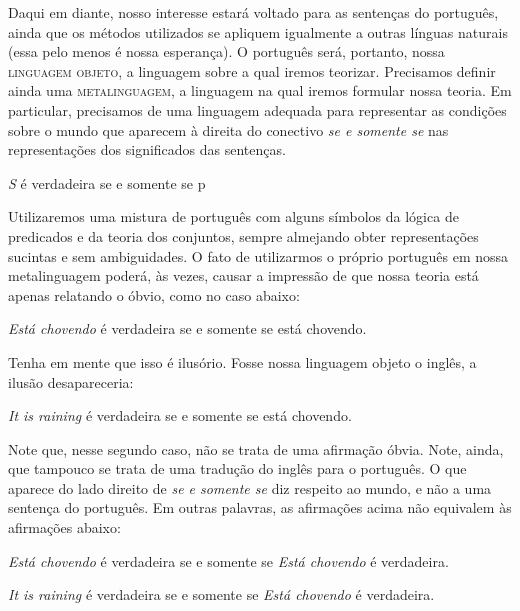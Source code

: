 Daqui em diante, nosso interesse estará voltado para as
sen\-ten\-ças do português, ainda que os métodos utilizados se
apliquem igualmente a outras línguas naturais (essa pelo menos é
nossa esperança). O português será, portanto, nossa
\textsc{linguagem objeto}, a linguagem sobre a qual
iremos teorizar. Precisamos definir ainda uma
\textsc{metalinguagem}, a linguagem na qual iremos
formular nossa teoria. Em particular, precisamos de uma linguagem
adequada para representar as condi\-çõ\-es sobre o mundo que
aparecem à direita do conectivo \textit{se e somente se}  nas
representa\-çõ\-es dos significados das sen\-ten\-ças.

\begin{exe} 
	\ex \textit{S} é verdadeira se e somente se p
\end{exe}

\n Utilizaremos uma mistura de português com alguns
símbolos da lógica de predicados e da teoria dos conjuntos, sempre
almejando obter representa\-çõ\-es sucintas e
sem ambiguidades. O fato de utilizarmos o próprio português em
nossa metalinguagem poderá, às vezes, causar a impressão de que
nossa teoria está apenas relatando o óbvio, como no caso
abaixo:

\begin{exe} 
	\ex \textit{Está chovendo} é verdadeira se e somente se está chovendo.
\end{exe}

\n Tenha em mente que isso é ilusório. Fosse nossa linguagem
objeto o inglês, a ilusão desapareceria:

\begin{exe} 
	\ex \textit{It is raining} é verdadeira se e somente se está chovendo.
\end{exe}

\noindent Note que, nesse segundo caso, não se trata de uma
afirma\-ção óbvia. Note, ainda, que tampouco se trata de uma
tradu\-ção do inglês para o português. O que aparece do lado
direito de \textit{se e somente se} diz respeito ao mundo, e não a
uma sentença do português. Em outras palavras, as afirma\-çõ\-es
acima não equivalem às afirmações abaixo:

\begin{exe} 
	\ex \textit{Está chovendo} é verdadeira se e somente se \textit{Está chovendo} é verdadeira.
\end{exe}

\begin{exe} 
	\ex \textit{It is raining} é verdadeira se e somente se \textit{Está chovendo} é verdadeira.
\end{exe}


